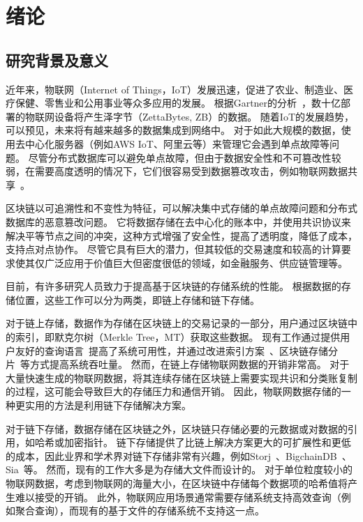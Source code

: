 
\chapter{绪论}
\section{研究背景及意义}
近年来，物联网（Internet of Things，IoT）发展迅速，促进了农业、制造业、医疗保健、零售业和公用事业等众多应用的发展。
根据Gartner的分析~\cite{hung2017leading}，数十亿部署的物联网设备将产生泽字节（ZettaBytes, ZB）的数据。
随着IoT的发展趋势，可以预见，未来将有越来越多的数据集成到网络中。
对于如此大规模的数据，使用去中心化服务器（例如AWS IoT、阿里云等）来管理它会遇到单点故障等问题。
尽管分布式数据库可以避免单点故障，但由于数据安全性和不可篡改性较弱，在需要高度透明的情况下，它们很容易受到数据篡改攻击，例如物联网数据共享~\cite{chen2022blockchain}。

区块链以可追溯性和不变性为特征，可以解决集中式存储的单点故障问题和分布式数据库的恶意篡改问题。
它将数据存储在去中心化的账本中，并使用共识协议来解决平等节点之间的冲突，这种方式增强了安全性，提高了透明度，降低了成本，支持点对点协作。
尽管它具有巨大的潜力，但其较低的交易速度和较高的计算要求使其仅广泛应用于价值巨大但密度很低的领域，如金融服务、供应链管理等。

目前，有许多研究人员致力于提高基于区块链的存储系统的性能。
根据数据的存储位置，这些工作可以分为两类，即链上存储和链下存储。

对于链上存储，数据作为存储在区块链上的交易记录的一部分，用户通过区块链中的索引，即默克尔树（Merkle Tree，MT）获取这些数据。
现有工作通过提供用户友好的查询语言~\cite{zhu2019sebdb,xu2019vchain,wang2022vchain+}提高了系统可用性，并通过改进索引方案~\cite{li2023lvmt,zhang2024cole}、区块链存储分片~\cite{zamani2018rapidchain,hong2023gridb,el2019blockchaindb}等方式提高系统吞吐量。
然而，在链上存储物联网数据的开销非常高。
对于大量快速生成的物联网数据，将其连续存储在区块链上需要实现共识和分类账复制的过程，这可能会导致巨大的存储压力和通信开销。
因此，物联网数据存储的一种更实用的方法是利用链下存储解决方案。

对于链下存储，数据存储在区块链之外，区块链只存储必要的元数据或对数据的引用，如哈希或加密指针。
链下存储提供了比链上解决方案更大的可扩展性和更低的成本，因此业界和学术界对链下存储非常有兴趣，例如Storj~\cite{storj2018storj}、BigchainDB~\cite{mcconaghy2016bigchaindb}、Sia~\cite{sia}等。
然而，现有的工作大多是为存储大文件而设计的。
对于单位粒度较小的物联网数据，考虑到物联网的海量大小，在区块链中存储每个数据项的哈希值将产生难以接受的开销。
此外，物联网应用场景通常需要存储系统支持高效查询（例如聚合查询），而现有的基于文件的存储系统不支持这一点。

